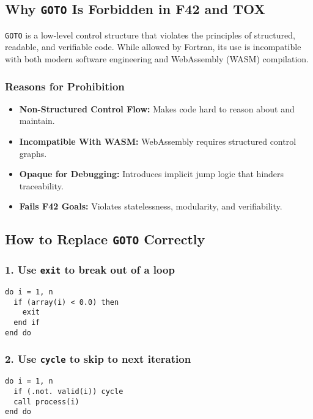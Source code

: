\documentclass{article}
\begin{document}
\vspace{1em}
\subsection{Why \texttt{GOTO} Is Forbidden in F42 and TOX}

\texttt{GOTO} is a low-level control structure that violates the principles of structured, readable, and verifiable code. While allowed by Fortran, its use is incompatible with both modern software engineering and WebAssembly (WASM) compilation.

\subsubsection*{Reasons for Prohibition}
\begin{itemize}
  \item \textbf{Non-Structured Control Flow:} Makes code hard to reason about and maintain.
  \item \textbf{Incompatible With WASM:} WebAssembly requires structured control graphs.
  \item \textbf{Opaque for Debugging:} Introduces implicit jump logic that hinders traceability.
  \item \textbf{Fails F42 Goals:} Violates statelessness, modularity, and verifiability.
\end{itemize}

\subsection{How to Replace \texttt{GOTO} Correctly}

\subsubsection*{1. Use \texttt{exit} to break out of a loop}
\begin{verbatim}
do i = 1, n
  if (array(i) < 0.0) then
    exit
  end if
end do
\end{verbatim}

\subsubsection*{2. Use \texttt{cycle} to skip to next iteration}
\begin{verbatim}
do i = 1, n
  if (.not. valid(i)) cycle
  call process(i)
end do
\end{verbatim}
\end{document}
